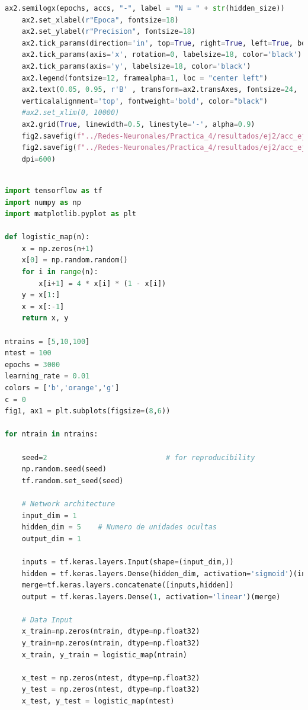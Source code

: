 \documentclass[11pt,twocolumn,twoside]{opticajnl}
\begin{document}
\begin{onecolumn}
\begin{lstlisting}[language=Python, caption={Ejercicio 2}, label=ej2]
    ax2.semilogx(epochs, accs, "-", label = "N = " + str(hidden_size))
    ax2.set_xlabel(r"Epoca", fontsize=18)
    ax2.set_ylabel(r"Precision", fontsize=18)
    ax2.tick_params(direction='in', top=True, right=True, left=True, bottom=True)
    ax2.tick_params(axis='x', rotation=0, labelsize=18, color='black')
    ax2.tick_params(axis='y', labelsize=18, color='black')
    ax2.legend(fontsize=12, framealpha=1, loc = "center left")
    ax2.text(0.05, 0.95, r'B' , transform=ax2.transAxes, fontsize=24, 
    verticalalignment='top', fontweight='bold', color="black")
    #ax2.set_xlim(0, 10000)
    ax2.grid(True, linewidth=0.5, linestyle='-', alpha=0.9)
    fig2.savefig(f"../Redes-Neuronales/Practica_4/resultados/ej2/acc_ej2.pdf")
    fig2.savefig(f"../Redes-Neuronales/Practica_4/resultados/ej2/acc_ej2.png", 
    dpi=600)

\end{lstlisting}

\begin{lstlisting}[language=Python, caption={Ejercicio 3}, label=ej3]

import tensorflow as tf
import numpy as np
import matplotlib.pyplot as plt

def logistic_map(n):
    x = np.zeros(n+1)
    x[0] = np.random.random()
    for i in range(n):
        x[i+1] = 4 * x[i] * (1 - x[i])
    y = x[1:]
    x = x[:-1]
    return x, y

ntrains = [5,10,100]
ntest = 100
epochs = 3000
learning_rate = 0.01
colors = ['b','orange','g']
c = 0
fig1, ax1 = plt.subplots(figsize=(8,6)) 

for ntrain in ntrains:

    seed=2                            # for reproducibility 
    np.random.seed(seed)
    tf.random.set_seed(seed)

    # Network architecture
    input_dim = 1
    hidden_dim = 5    # Numero de unidades ocultas
    output_dim = 1

    inputs = tf.keras.layers.Input(shape=(input_dim,))
    hidden = tf.keras.layers.Dense(hidden_dim, activation='sigmoid')(inputs)
    merge=tf.keras.layers.concatenate([inputs,hidden])
    output = tf.keras.layers.Dense(1, activation='linear')(merge)

    # Data Input
    x_train=np.zeros(ntrain, dtype=np.float32)
    y_train=np.zeros(ntrain, dtype=np.float32)
    x_train, y_train = logistic_map(ntrain)
        
    x_test = np.zeros(ntest, dtype=np.float32)
    y_test = np.zeros(ntest, dtype=np.float32)
    x_test, y_test = logistic_map(ntest)


\end{lstlisting}
\end{onecolumn}
\end{document}
